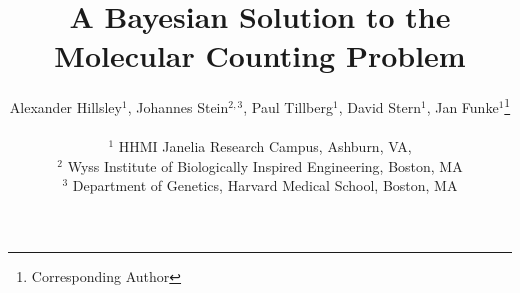 \documentclass[twocolumn]{article}
\begin{document}
\title{A Bayesian Solution to the Molecular Counting Problem}

\author{
  Alexander Hillsley$^{1}$,
  Johannes Stein$^{2,3}$,
  Paul Tillberg$^{1}$,
  David Stern$^{1}$,
  Jan Funke$^{1}$\thanks{Corresponding Author}
  \\\\
  \normalsize{$^1$ HHMI Janelia Research Campus, Ashburn, VA}, \\
  \normalsize{$^2$ Wyss Institute of Biologically Inspired Engineering, Boston, MA} \\
  \normalsize{$^3$ Department of Genetics, Harvard Medical School, Boston, MA}
  }

\maketitle








{
  \small
  
  
}

\clearpage
% 
\end{document}
